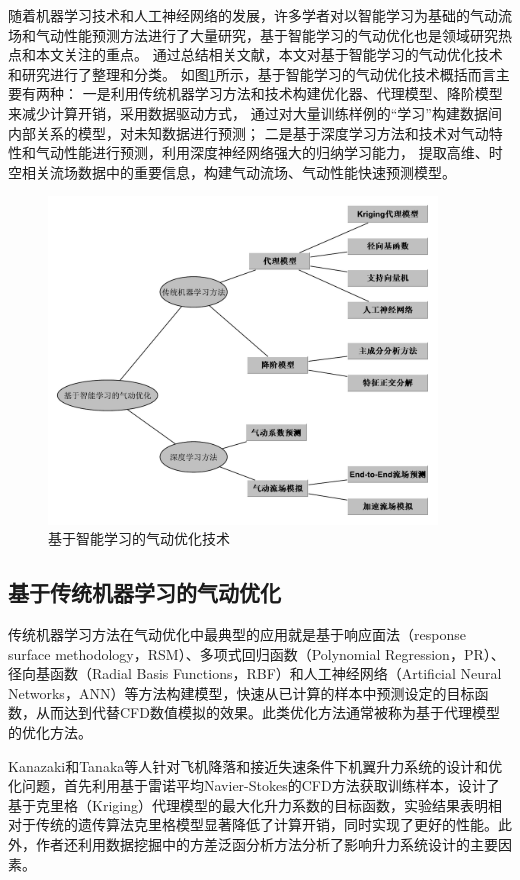 随着机器学习技术和人工神经网络的发展，许多学者对以智能学习为基础的气动流场和气动性能预测方法进行了大量研究，基于智能学习的气动优化也是领域研究热点和本文关注的重点。
通过总结相关文献，本文对基于智能学习的气动优化技术和研究进行了整理和分类。
如图\ref{fig:智能优化}所示，基于智能学习的气动优化技术概括而言主要有两种：
一是利用传统机器学习方法和技术构建优化器、代理模型、降阶模型来减少计算开销，采用数据驱动方式，
通过对大量训练样例的“学习”构建数据间内部关系的模型，对未知数据进行预测；
二是基于深度学习方法和技术对气动特性和气动性能进行预测，利用深度神经网络强大的归纳学习能力，
提取高维、时空相关流场数据中的重要信息，构建气动流场、气动性能快速预测模型。

\begin{figure}[htp]
	\centering
	\includegraphics[width=0.92\textwidth]{figures/aicfd.pdf}
	\caption{基于智能学习的气动优化技术}
	\label{fig:智能优化}
\end{figure}

\subsection{基于传统机器学习的气动优化}
传统机器学习方法在气动优化中最典型的应用就是基于响应面法（response surface methodology，RSM）、多项式回归函数（Polynomial Regression，PR）、径向基函数（Radial Basis Functions，RBF）和人工神经网络（Artificial Neural Networks，ANN）等方法构建模型，快速从已计算的样本中预测设定的目标函数，从而达到代替CFD数值模拟的效果。此类优化方法通常被称为基于代理模型的优化方法。

Kanazaki和Tanaka等人\cite{Kanazaki2007Multi}针对飞机降落和接近失速条件下机翼升力系统的设计和优化问题，首先利用基于雷诺平均Navier-Stokes的CFD方法获取训练样本，设计了基于克里格（Kriging）代理模型的最大化升力系数的目标函数，实验结果表明相对于传统的遗传算法克里格模型显著降低了计算开销，同时实现了更好的性能。此外，作者还利用数据挖掘中的方差泛函分析方法分析了影响升力系统设计的主要因素。

